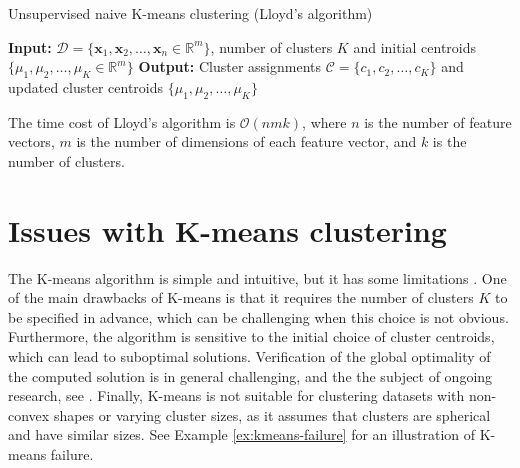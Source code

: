 \documentclass{article}[11pt]
\newcommand{\norm}[1]{\left|\left|#1\right|\right|}
\DeclareMathOperator*{\argmin}{arg\,min}
\begin{document}
\begin{algorithm}[H]
   \begin{algorithmic}
   \caption{Unsupervised naive K-means clustering (Lloyd's algorithm)}\label{alg:kmeans}
   \State \textbf{Input:} $\mathcal{D} = \{\mathbf{x}_1, \mathbf{x}_2, \ldots, \mathbf{x}_n\in\mathbb{R}^{m}\}$, number of clusters $K$ and initial centroids $\{\mu_1, \mu_2, \ldots, \mu_K\in\mathbb{R}^{m}\}$
   \State \textbf{Output:} Cluster assignments $\mathcal{C} = \{c_1, c_2, \ldots, c_K\}$ and updated cluster centroids $\{\mu_1, \mu_2, \ldots, \mu_K\}$
      \State{$c_{i}\gets\argmin_{j} \norm{\mathbf{x} - \mu_j}^2$}
   \EndFor 
   \Statex
   \State{$\hat{\mu}\gets\mu$}
   \EndFor
   \Statex
   \If{$\norm{\mu - \hat{\mu}} < \epsilon$}
   \EndIf
   \EndWhile
   \end{algorithmic}
\end{algorithm}
The time cost of Lloyd’s algorithm is $\mathcal{O}(nmk)$, where $n$ is the number of feature vectors, $m$ is the number of dimensions of each feature vector,
and $k$ is the number of clusters.

\section{Issues with K-means clustering}
The K-means algorithm is simple and intuitive, but it has some limitations \citep{Raykov:2016aa}.
One of the main drawbacks of K-means is that it requires the number of clusters $K$ to be specified in advance, which can be challenging when this choice is not obvious.
Furthermore, the algorithm is sensitive to the initial choice of cluster centroids, which can lead to suboptimal solutions.
Verification of the global optimality of the computed solution is in general challenging, and the the subject of ongoing research, see \citep{Peng:2007, Iguchi:2016, Clum:2022}.
Finally, K-means is not suitable for clustering datasets with non-convex shapes or varying cluster sizes, as it assumes that clusters are spherical and have similar sizes.
See Example \ref{ex:kmeans-failure} for an illustration of K-means failure.
\end{document}
